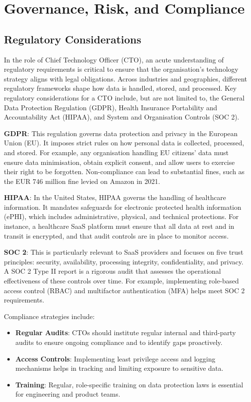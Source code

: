 \section{Governance, Risk, and Compliance}

\subsection{Regulatory Considerations}

In the role of Chief Technology Officer (CTO), an acute understanding of regulatory requirements is critical to ensure that the organisation's technology strategy aligns with legal obligations. Across industries and geographies, different regulatory frameworks shape how data is handled, stored, and processed. Key regulatory considerations for a CTO include, but are not limited to, the General Data Protection Regulation (GDPR), Health Insurance Portability and Accountability Act (HIPAA), and System and Organisation Controls (SOC 2).

\textbf{GDPR}: This regulation governs data protection and privacy in the European Union (EU). It imposes strict rules on how personal data is collected, processed, and stored. For example, any organisation handling EU citizens' data must ensure data minimisation, obtain explicit consent, and allow users to exercise their right to be forgotten. Non-compliance can lead to substantial fines, such as the EUR 746 million fine levied on Amazon in 2021.

\textbf{HIPAA}: In the United States, HIPAA governs the handling of healthcare information. It mandates safeguards for electronic protected health information (ePHI), which includes administrative, physical, and technical protections. For instance, a healthcare SaaS platform must ensure that all data at rest and in transit is encrypted, and that audit controls are in place to monitor access.

\textbf{SOC 2}: This is particularly relevant to SaaS providers and focuses on five trust principles: security, availability, processing integrity, confidentiality, and privacy. A SOC 2 Type II report is a rigorous audit that assesses the operational effectiveness of these controls over time. For example, implementing role-based access control (RBAC) and multifactor authentication (MFA) helps meet SOC 2 requirements.

Compliance strategies include:
\begin{itemize}
    \item \textbf{Regular Audits}: CTOs should institute regular internal and third-party audits to ensure ongoing compliance and to identify gaps proactively.
    \item \textbf{Access Controls}: Implementing least privilege access and logging mechanisms helps in tracking and limiting exposure to sensitive data.
    \item \textbf{Training}: Regular, role-specific training on data protection laws is essential for engineering and product teams.
\end{itemize}

